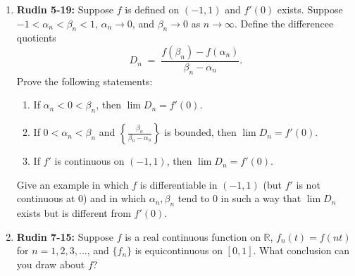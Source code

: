 \documentclass[11pt]{article}
\newcommand{\R}{\mathbb{R}}
\begin{document}
\begin{enumerate}
    \item \textbf{Rudin 5-19:} Suppose \(f\) is defined on \((-1,1)\) and \(f'(0)\) exists.  Suppose 
      \(-1 < \alpha_n < \beta_n < 1\), \(\alpha_n \to 0\), and \(\beta_n \to 0\) as \(n \to \infty\).  Define 
      the differencee quotients
      \[D_n \;=\; \frac{f(\beta_n) - f(\alpha_n)}{\beta_n - \alpha_n}.\]
      Prove the following statements:
      \begin{enumerate}
        \item If \(\alpha_n < 0 < \beta_n\), then \(\lim D_n = f'(0)\).
        \item If \(0 < \alpha_n < \beta_n\) and \(\left\{ \frac{\beta_n}{\beta_n - \alpha_n} \right\}\) is 
          bounded, then \(\lim D_n = f'(0)\).
        \item If \(f'\) is continuous on \((-1,1)\), then \(\lim D_n = f'(0)\).
      \end{enumerate}

      Give an example in which \(f\) is differentiable in \((-1,1)\) (but \(f'\) is not continuous at 0) and in 
      which \(\alpha_n, \beta_n\) tend to \(0\) in such a way that \(\lim D_n\) exists but is different from \(f'(0)\).
      \newpage

    \item \textbf{Rudin 7-15:} Suppose \(f\) is a real continuous function on \(\R\), \(f_n(t) = f(nt)\) for 
      \(n = 1,2,3,\hdots\), and \(\{f_n\}\) is equicontinuous on \([0,1]\).  What conclusion can you draw about 
      \(f\)?
  \end{enumerate}
\end{document}
